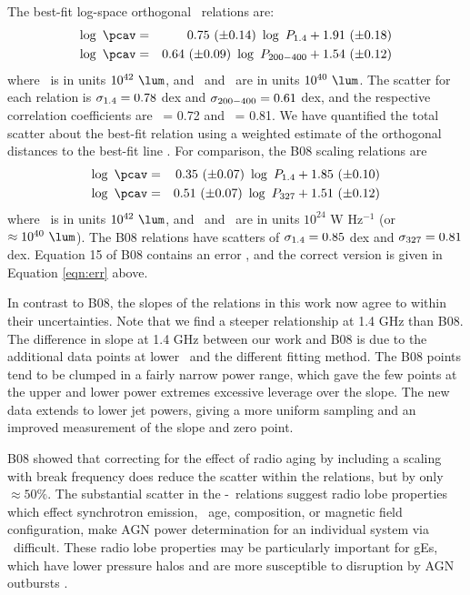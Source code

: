 \documentclass{emulateapj}
\begin{document}
The best-fit log-space orthogonal \bces\ relations are:
\begin{eqnarray}
  \log~\pcav &=& 0.75~(\pm 0.14)~\log~\phigh + 1.91~(\pm 0.18) \label{eqn:high}\\
  \log~\pcav &=& 0.64~(\pm 0.09)~\log~\plow + 1.54~(\pm 0.12) \label{eqn:low}
\end{eqnarray}
where \pcav\ is in units $10^{42} ~\lum$, and \phigh\ and \plow\ are
in units $10^{40} ~\lum$. The scatter for each relation is $\sigma_{\mathrm{1.4}} =
0.78$ dex and $\sigma_{\mathrm{200-400}} = 0.61$ dex, and the respective correlation
coefficients are \rhigh\ = 0.72 and \rlow\ = 0.81. We have quantified
the total scatter about the best-fit relation using a weighted
estimate of the orthogonal distances to the best-fit line
\citep[see][]{2009A&A...498..361P}. For comparison, the B08 scaling
relations are
\begin{eqnarray}
  \log~\pcav &=& 0.35~(\pm 0.07)~\log~\phigh + 1.85~(\pm 0.10) \\
  \log~\pcav &=& 0.51~(\pm 0.07)~\log~\pthree + 1.51~(\pm 0.12) \label{eqn:err}
\end{eqnarray}
where \pcav\ is in units $10^{42} ~\lum$, and \phigh\ and \pthree\ are
in units $10^{24}$ W Hz$^{-1}$ (or $\approx 10^{40} ~\lum$). The B08
relations have scatters of $\sigma_{\mathrm{1.4}} = 0.85$ dex and $\sigma_{\mathrm{327}} = 0.81$
dex. Equation 15 of B08 contains an error \citep{birzan08err}, and the
correct version is given in Equation \ref{eqn:err} above.

In contrast to B08, the slopes of the relations in this work now agree
to within their uncertainties. Note that we find a steeper
relationship at 1.4 GHz than B08. The difference in slope at 1.4 GHz
between our work and B08 is due to the additional data points at lower
\pjet\ and the different fitting method. The B08 points tend to be
clumped in a fairly narrow power range, which gave the few points at
the upper and lower power extremes excessive leverage over the
slope. The new data extends to lower jet powers, giving a more uniform
sampling and an improved measurement of the slope and zero point.

B08 showed that correcting for the effect of radio aging by including
a scaling with break frequency does reduce the scatter within the
relations, but by only $\approx 50\%$. The substantial scatter in the
\pjet-\prad\ relations suggest radio lobe properties which effect
synchrotron emission, \eg\ age, composition, or magnetic field
configuration, make AGN power determination for an individual system
via \prad\ difficult. These radio lobe properties may be particularly
important for gEs, which have lower pressure halos and are more
susceptible to disruption by AGN outbursts \citep{2006MNRAS.372.1161W,
  2008ApJ...687L..53P}.
\end{document}
